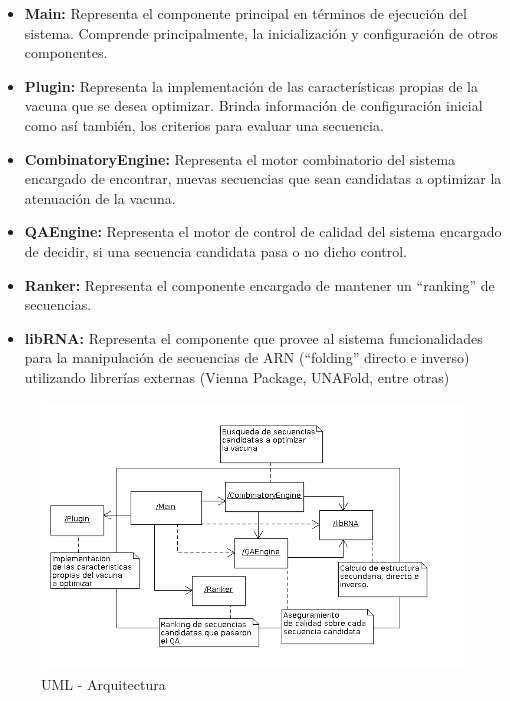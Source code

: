 \documentclass[a4paper,10pt]{article}
\begin{document}
  \begin{itemize}
   \item \textbf{Main:} Representa el componente principal en t\'erminos de
ejecuci\'on del sistema. Comprende principalmente, la inicializaci\'on y
configuraci\'on de otros componentes.

   \item \textbf{Plugin:} Representa la implementaci\'on de las
caracter\'isticas propias de la vacuna que se desea optimizar. Brinda
informaci\'on de configuraci\'on inicial como as\'i tambi\'en, los criterios
para evaluar una secuencia.

   \item \textbf{CombinatoryEngine:} Representa el motor combinatorio del
sistema encargado de encontrar, nuevas secuencias que sean candidatas a
optimizar la atenuaci\'on de la vacuna.

   \item \textbf{QAEngine:} Representa el motor de control de calidad del
sistema encargado de decidir, si una secuencia candidata pasa o no dicho
control.

   \item \textbf{Ranker:} Representa el componente encargado de mantener un
``ranking'' de secuencias.

   \item \textbf{libRNA:} Representa el componente que provee al sistema
funcionalidades para la manipulaci\'on de secuencias de ARN (``folding'' directo
e inverso) utilizando librer\'ias externas (Vienna Package, UNAFold, entre
otras)

  \end{itemize}

  \begin{figure}
  \centering
  \includegraphics[scale=0.5]{architecture.png}  
  \caption{UML - Arquitectura}
  \label{uml:architecture}
  \end{figure}
\end{document}

